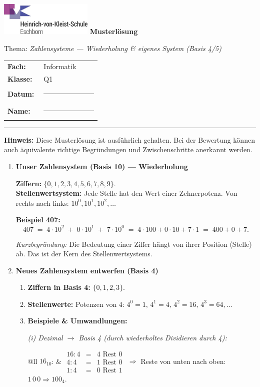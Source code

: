 \documentclass[11pt,a4paper]{scrartcl}
\newcommand{\blatttyp}{Musterlösung}
\newcommand{\thema}{\textit{Zahlensysteme — Wiederholung \& eigenes System (Basis 4/5)}}
\newcommand{\sheettitle}[2]{%
	\begin{minipage}[t]{0.62\linewidth}
		\includegraphics[height=1.6cm]{hvk-logo.png} %
		\vspace{0.6em}
		{\Large\bfseries #1}\par\vspace{-0.2em}
		{\normalsize #2}
	\end{minipage}\hfill
	\begin{minipage}[t]{0.35\linewidth}
		\renewcommand{\arraystretch}{1.2}
		\begin{tabular}{>{\bfseries}p{0.36\linewidth}p{0.58\linewidth}}
			Fach: & Informatik \\
			Klasse: & Q1 \\
			Datum: & \rule{3.8cm}{0.4pt} \\
			Name: & \rule{3.8cm}{0.4pt} \\
		\end{tabular}
	\end{minipage}
	\vspace{0.8em}\par\hrule\vspace{1.0em}
}
\newenvironment{loesungen}{%
	\begin{enumerate}[leftmargin=*,label=\textbf{Lösung~\arabic*:}]
	}{\end{enumerate}}
\newenvironment{schritte}{%
	\begin{enumerate}[leftmargin=*,label=\alph*)]
	}{\end{enumerate}}
\begin{document}
	
	\sheettitle{\blatttyp}{Thema: \thema}
	
	\textbf{Hinweis:} Diese Musterlösung ist ausführlich gehalten. Bei der Bewertung können auch äquivalente richtige Begründungen und Zwischenschritte anerkannt werden.
	
	\begin{loesungen}
		
		\item \textbf{Unser Zahlensystem (Basis 10) — Wiederholung}
		
		\textbf{Ziffern:} \(\{0,1,2,3,4,5,6,7,8,9\}\).\\
		\textbf{Stellenwertsystem:} Jede Stelle hat den Wert einer Zehnerpotenz. Von rechts nach links: \(10^0,10^1,10^2,\dots\)
		
		\textbf{Beispiel 407:}
		\[
		407 \;=\; 4\cdot 10^2 \;+\; 0\cdot 10^1 \;+\; 7\cdot 10^0
		\;=\; 4\cdot 100 + 0\cdot 10 + 7\cdot 1
		\;=\; 400 + 0 + 7.
		\]
		
		\emph{Kurzbegründung:} Die Bedeutung einer Ziffer hängt von ihrer Position (Stelle) ab. Das ist der Kern des Stellenwertsystems.
		
		\vspace{0.6em}
		
		\item \textbf{Neues Zahlensystem entwerfen (Basis 4)}
		
		\begin{schritte}
			\item \textbf{Ziffern in Basis 4:} \(\{0,1,2,3\}\).
			
			\item \textbf{Stellenwerte:} Potenzen von 4: \(4^0=1,\,4^1=4,\,4^2=16,\,4^3=64,\dots\)
			
			\item \textbf{Beispiele \& Umwandlungen:}
			
			\textit{(i) Dezimal \(\to\) Basis 4 (durch wiederholtes Dividieren durch 4):}
			
			\begin{tabular}{@{}ll}
				\(16_{10}\): &
				\(\begin{array}{rcl}
					16 : 4 &=& 4 \text{ Rest } 0 \\
					4 : 4 &=& 1 \text{ Rest } 0 \\
					1 : 4 &=& 0 \text{ Rest } 1
				\end{array}\)
				\(\Rightarrow\) Reste von unten nach oben: \(1\,0\,0 \Rightarrow 100_4\).
			\end{tabular}
			

\end{schritte}
\end{loesungen}
\end{document}
